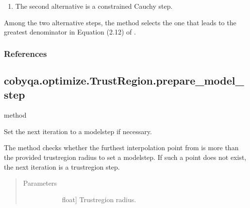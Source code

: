 \documentclass[letterpaper,10pt,english]{sphinxmanual}
\begin{document}
\begin{fulllineitems}
\begin{fulllineitems}
\begin{enumerate}
\item {} 
\sphinxAtStartPar
The second alternative is a constrained Cauchy step.

\end{enumerate}

\sphinxAtStartPar
Among the two alternative steps, the method selects the one that leads
to the greatest denominator in Equation (2.12) of .
\subsubsection*{References}

\sphinxAtStartPar
{}

\end{fulllineitems}



\subsection{cobyqa.optimize.TrustRegion.prepare\_model\_step}
\label{\detokenize{refs/generated/cobyqa.optimize.TrustRegion.prepare_model_step:cobyqa-optimize-trustregion-prepare-model-step}}\label{\detokenize{refs/generated/cobyqa.optimize.TrustRegion.prepare_model_step::doc}}
\sphinxAtStartPar
method

\begin{fulllineitems}
\label{\detokenize{refs/generated/cobyqa.optimize.TrustRegion.prepare_model_step:cobyqa.optimize.TrustRegion.prepare_model_step}}
\sphinxAtStartPar
Set the next iteration to a model\sphinxhyphen{}step if necessary.

\sphinxAtStartPar
The method checks whether the furthest interpolation point from
 is more than the provided trust\sphinxhyphen{}region radius to set a
model\sphinxhyphen{}step. If such a point does not exist, the next iteration is a
trust\sphinxhyphen{}region step.
\begin{quote}\begin{description}
\item[{Parameters}] \leavevmode\begin{description}
\item[{}] \leavevmode{[}float{]}
\sphinxAtStartPar
Trust\sphinxhyphen{}region radius.


\end{description}
\end{description}
\end{quote}
\end{fulllineitems}
\end{fulllineitems}
\end{document}
